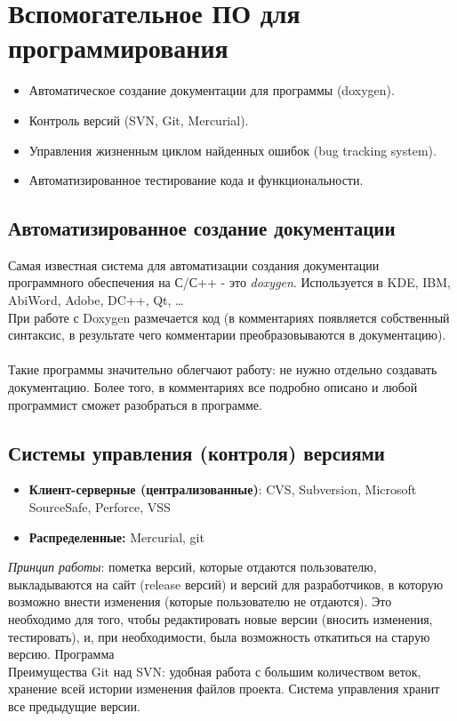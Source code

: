 \section{Вспомогательное ПО для программирования}
\begin{itemize}
  \item Автоматическое создание документации для программы (doxygen).
  \item Контроль версий (SVN, Git, Mercurial).
  \item Управления жизненным циклом найденных ошибок (bug tracking system).
  \item Автоматизированное тестирование кода и функциональности.
\end{itemize}
\subsection{Автоматизированное создание документации}
Самая известная система для автоматизации создания документации программного обеспечения на С/С++ - это \emph{doxygen}. Используется в KDE, IBM, AbiWord, Adobe, DC++, Qt, \dots
\\При работе с Doxygen размечается код (в комментариях появляется собственный синтаксис, в результате чего комментарии преобразовываются в документацию).
\\
\\Такие программы значительно облегчают работу: не нужно отдельно создавать документацию. Более того, в комментариях все подробно описано и любой программист сможет разобраться в программе.
\subsection{Системы управления (контроля) версиями}
\begin{itemize}
  \item \textbf{Клиент-серверные (централизованные)}: CVS, Subversion, Microsoft SourceSafe, Perforce, VSS
  \item \textbf{Распределенные:} Mercurial, git
  \end{itemize}
\emph{Принцип работы}: пометка версий, которые отдаются пользователю, выкладываются на сайт (release версий) и версий для разработчиков, в которую возможно внести изменения (которые пользователю не отдаются). Это необходимо для того, чтобы редактировать новые версии (вносить изменения, тестировать), и, при необходимости, была возможность откатиться на старую версию. Программа
\\Преимущества Git над SVN: удобная работа с большим количеством веток, хранение всей истории изменения файлов проекта. Система управления хранит все предыдущие версии.
